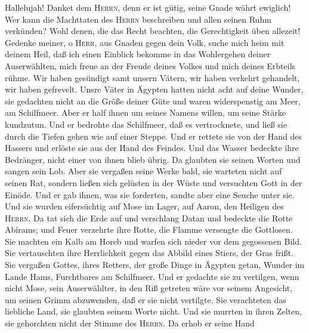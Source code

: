  Hallelujah! Danket dem \textsc{Herrn}, denn er ist gütig,
seine Gnade währt ewiglich!  Wer kann die Machttaten des
\textsc{Herrn} beschreiben und allen seinen Ruhm verkünden?
 Wohl denen, die das Recht beachten, die Gerechtigkeit
üben allezeit!  Gedenke meiner, o \textsc{Herr}, aus
Gnaden gegen dein Volk, suche mich heim mit deinem Heil, 
daß ich einen Einblick bekomme in das Wohlergehen deiner Auserwählten,
mich freue an der Freude deines Volkes und mich deines Erbteils rühme.
 Wir haben gesündigt samt unsern Vätern, wir haben
verkehrt gehandelt, wir haben gefrevelt.  Unsre Väter in
Ägypten hatten nicht acht auf deine Wunder, sie gedachten nicht an die
Größe deiner Güte und waren widerspenstig am Meer, am Schilfmeer.
 Aber er half ihnen um seines Namens willen, um seine
Stärke kundzutun.  Und er bedrohte das Schilfmeer, daß es
vertrocknete, und ließ sie durch die Tiefen gehen wie auf einer Steppe.
 Und er rettete sie von der Hand des Hassers und erlöste
sie aus der Hand des Feindes.  Und das Wasser bedeckte
ihre Bedränger, nicht einer von ihnen blieb übrig.  Da
glaubten sie seinen Worten und sangen sein Lob.  Aber sie
vergaßen seine Werke bald, sie warteten nicht auf seinen Rat,
 sondern ließen sich gelüsten in der Wüste und versuchten
Gott in der Einöde.  Und er gab ihnen, was sie forderten,
sandte aber eine Seuche unter sie.  Und sie wurden
eifersüchtig auf Mose im Lager, auf Aaron, den Heiligen des
\textsc{Herrn}.  Da tat sich die Erde auf und verschlang
Datan und bedeckte die Rotte Abirams;  und Feuer
verzehrte ihre Rotte, die Flamme versengte die Gottlosen.
 Sie machten ein Kalb am Horeb und warfen sich nieder vor
dem gegossenen Bild.  Sie vertauschten ihre Herrlichkeit
gegen das Abbild eines Stiers, der Gras frißt.  Sie
vergaßen Gottes, ihres Retters, der große Dinge in Ägypten getan,
 Wunder im Lande Hams, Furchtbares am Schilfmeer.
 Und er gedachte sie zu vertilgen, wenn nicht Mose, sein
Auserwählter, in den Riß getreten wäre vor seinem Angesicht, um seinen
Grimm abzuwenden, daß er sie nicht vertilgte.  Sie
verachteten das liebliche Land, sie glaubten seinem Worte nicht.
 Und sie murrten in ihren Zelten, sie gehorchten nicht
der Stimme des \textsc{Herrn}.  Da erhob er seine Hand
